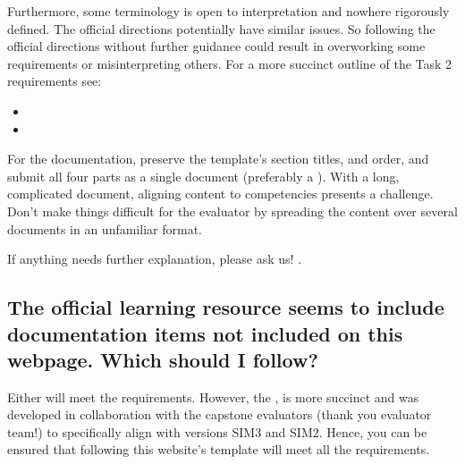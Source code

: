 \documentclass[letterpaper,10pt,english]{jupyterBook}
\begin{document}
\sphinxAtStartPar
Furthermore, some terminology is open to interpretation and nowhere rigorously defined. The official directions potentially have similar issues. So following the official directions without further guidance could result in overworking some requirements or misinterpreting others. For a more succinct outline of the Task 2 requirements see:
\begin{itemize}
\item {} 
\sphinxAtStartPar
{}

\item {} 
\sphinxAtStartPar
{}

\end{itemize}

\sphinxAtStartPar
For the documentation, preserve the template’s section titles, and order, and submit all four parts as a single document (preferably a ). With a long, complicated document, aligning content to competencies presents a challenge. Don’t make things difficult for the evaluator by spreading the content over several documents in an unfamiliar format.

\sphinxAtStartPar
If anything needs further explanation, please ask us! .


\subsection{The official learning resource seems to include documentation items not included on this webpage. Which should I follow?}
\label{\detokenize{task1:the-official-learning-resource-seems-to-include-documentation-items-not-included-on-this-webpage-which-should-i-follow}}
\sphinxAtStartPar
Either will meet the requirements. However, the , is more succinct and was developed in collaboration with the capstone evaluators (thank you evaluator team!) to specifically align with versions SIM3 and SIM2. Hence, you can be ensured that following this website’s template will meet all the requirements.
\end{document}

